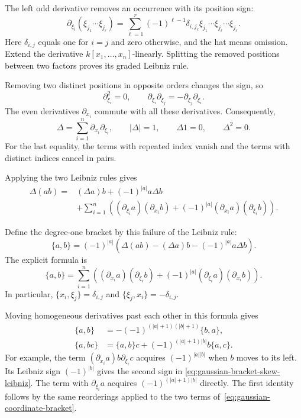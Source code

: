 The left odd derivative removes an occurrence with its position sign:
\[
 \partial_{\xi_i}(\xi_{j_1}\cdots\xi_{j_r})
 =\sum_{\ell=1}^r(-1)^{\ell-1}\delta_{i,j_\ell}
   \xi_{j_1}\cdots\widehat{\xi_{j_\ell}}\cdots\xi_{j_r}.
\]
Here $\delta_{i,j}$ equals one for $i=j$ and zero otherwise, and the hat
means omission. Extend the derivative $k[x_1,\ldots,x_n]$-linearly.
Splitting the removed positions between two factors proves its graded
Leibniz rule.

Removing two distinct positions in opposite orders changes
the sign, so
\[
 \partial_{\xi_i}^2=0,
 \qquad
 \partial_{\xi_i}\partial_{\xi_j}
 =-\partial_{\xi_j}\partial_{\xi_i}.
\]
The even derivatives $\partial_{x_i}$ commute with all these derivatives.
Consequently,
\[
 \Delta=\sum_{i=1}^n\partial_{x_i}\partial_{\xi_i},
 \qquad |\Delta|=1,
 \qquad \Delta1=0,
 \qquad \Delta^2=0.
\]
For the last equality, the terms with repeated index vanish and the
terms with distinct indices cancel in pairs.

Applying the two Leibniz rules gives
\[
 \begin{split}
 \Delta(ab)={}&(\Delta a)b+(-1)^{|a|}a\Delta b\\
 &+\sum_{i=1}^n\left(
    (\partial_{\xi_i}a)(\partial_{x_i}b)
    +(-1)^{|a|}(\partial_{x_i}a)(\partial_{\xi_i}b)\right).
 \end{split}
\]

Define the degree-one bracket by this failure of the Leibniz rule:
\begin{equation}\label{eq:gaussian-derived-bracket}
 \{a,b\}=(-1)^{|a|}
 \left(\Delta(ab)-(\Delta a)b-(-1)^{|a|}a\Delta b\right).
\end{equation}
The explicit formula is
\begin{equation}\label{eq:gaussian-coordinate-bracket}
 \{a,b\}=\sum_{i=1}^n\left(
  (\partial_{x_i}a)(\partial_{\xi_i}b)
  +(-1)^{|a|}(\partial_{\xi_i}a)(\partial_{x_i}b)\right).
\end{equation}
In particular, $\{x_i,\xi_j\}=\delta_{i,j}$ and
$\{\xi_j,x_i\}=-\delta_{i,j}$.

Moving homogeneous derivatives past each other in this formula gives
\begin{equation}\label{eq:gaussian-bracket-skew-leibniz}
 \begin{split}
 \{a,b\}&=-(-1)^{(|a|+1)(|b|+1)}\{b,a\},\\
 \{a,bc\}&=\{a,b\}c+(-1)^{(|a|+1)|b|}b\{a,c\}.
 \end{split}
\end{equation}
For example, the term $(\partial_{x_i}a)b\partial_{\xi_i}c$
acquires $(-1)^{|a||b|}$ when $b$ moves to its left.
Its Leibniz sign $(-1)^{|b|}$ gives the second sign in
\eqref{eq:gaussian-bracket-skew-leibniz}.
The term with $\partial_{\xi_i}a$ acquires
$(-1)^{(|a|+1)|b|}$ directly.
The first identity follows by the same reorderings applied to the two
terms of~\eqref{eq:gaussian-coordinate-bracket}.

